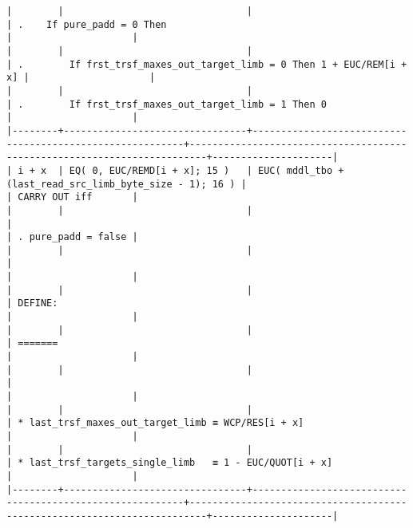 \documentclass[varwidth=\maxdimen,margin=0.5cm,multi={verbatim}]{standalone}
\begin{document}
\begin{verbatim}
|        |                                |                                                          | .    If pure_padd = 0 Then                                              |                     |
|        |                                |                                                          | .        If frst_trsf_maxes_out_target_limb = 0 Then 1 + EUC/REM[i + x] |                     |
|        |                                |                                                          | .        If frst_trsf_maxes_out_target_limb = 1 Then 0                  |                     |
|--------+--------------------------------+----------------------------------------------------------+-------------------------------------------------------------------------+---------------------|
| i + x  | EQ( 0, EUC/REMD[i + x]; 15 )   | EUC( mddl_tbo + (last_read_src_limb_byte_size - 1); 16 ) |                                                                         | CARRY OUT iff       |
|        |                                |                                                          |                                                                         | . pure_padd = false |
|        |                                |                                                          |                                                                         |                     |
|        |                                |                                                          | DEFINE:                                                                 |                     |
|        |                                |                                                          | =======                                                                 |                     |
|        |                                |                                                          |                                                                         |                     |
|        |                                |                                                          | * last_trsf_maxes_out_target_limb ≡ WCP/RES[i + x]                      |                     |
|        |                                |                                                          | * last_trsf_targets_single_limb   ≡ 1 - EUC/QUOT[i + x]                 |                     |
|--------+--------------------------------+----------------------------------------------------------+-------------------------------------------------------------------------+---------------------|


\end{verbatim}
\end{document}
